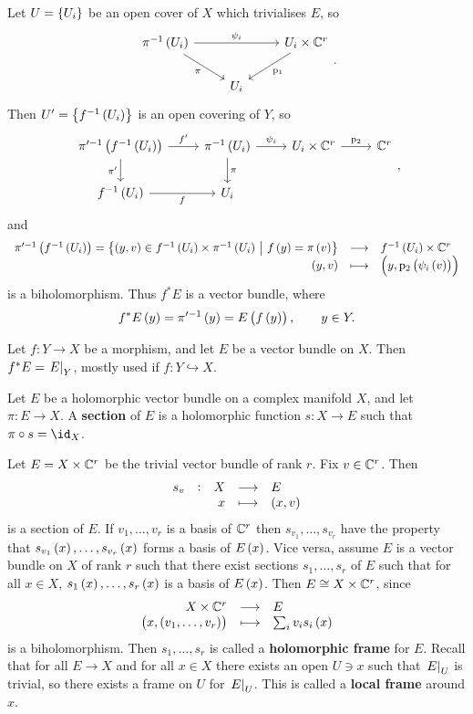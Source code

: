 Let $ U = \cbr{U_i} $ be an open cover of $ X $ which trivialises $ E $, so
$$
\begin{tikzcd}
\pi^{-1}\br{U_i} \arrow{rr}{\psi_i} \arrow[swap]{dr}{\pi} & & U_i \times \CC^r \arrow{dl}{\p_1} \\
& U_i &
\end{tikzcd}.
$$
Then $ U' = \cbr{f^{-1}\br{U_i}} $ is an open covering of $ Y $, so
$$
\begin{tikzcd}
\pi'^{-1}\br{f^{-1}\br{U_i}} \arrow{r}{f'} \arrow[swap]{d}{\pi'} & \pi^{-1}\br{U_i} \arrow{r}{\psi_i} \arrow{d}{\pi} & U_i \times \CC^r \arrow{r}{\p_2} & \CC^r \\
f^{-1}\br{U_i} \arrow[swap]{r}{f} & U_i & &
\end{tikzcd},
$$
and
$$ \function{\pi'^{-1}\br{f^{-1}\br{U_i}} = \cbr{\br{y, v} \in f^{-1}\br{U_i} \times \pi^{-1}\br{U_i} \st f\br{y} = \pi\br{v}}}{f^{-1}\br{U_i} \times \CC^r}{\br{y, v}}{\br{y, \p_2\br{\psi_i\br{v}}}} $$
is a biholomorphism. Thus $ f^*E $ is a vector bundle, where
$$ f^*E\br{y} = \pi'^{-1}\br{y} = E\br{f\br{y}}, \qquad y \in Y. $$

\begin{notation}
Let $ f : Y \to X $ be a morphism, and let $ E $ be a vector bundle on $ X $. Then $ f^*E = \left. E \right|_Y $, mostly used if $ f : Y \hookrightarrow X $.
\end{notation}

\begin{definition}
Let $ E $ be a holomorphic vector bundle on a complex manifold $ X $, and let $ \pi : E \to X $. A \textbf{section} of $ E $ is a holomorphic function $ s : X \to E $ such that $ \pi \circ s = \id_X $.
\end{definition}

\begin{example}
Let $ E = X \times \mathbb{C}^r $ be the trivial vector bundle of rank $ r $. Fix $ v \in \mathbb{C}^r $. Then
$$ \function[s_v]{X}{E}{x}{\br{x, v}} $$
is a section of $ E $. If $ v_1, \dots, v_r $ is a basis of $ \mathbb{C}^r $ then $ s_{v_1}, \dots, s_{v_r} $ have the property that $ s_{v_1}\br{x}, \dots, s_{v_r}\br{x} $ forms a basis of $ E\br{x} $. Vice versa, assume $ E $ is a vector bundle on $ X $ of rank $ r $ such that there exist sections $ s_1, \dots, s_r $ of $ E $ such that for all $ x \in X $, $ s_1\br{x}, \dots, s_r\br{x} $ is a basis of $ E\br{x} $. Then $ E \cong X \times \mathbb{C}^r $, since
$$ \function{X \times \CC^r}{E}{\br{x, \br{v_1, \dots, v_r}}}{\sum_i v_is_i\br{x}} $$
is a biholomorphism. Then $ s_1, \dots, s_r $ is called a \textbf{holomorphic frame} for $ E $. Recall that for all $ E \to X $ and for all $ x \in X $ there exists an open $ U \ni x $ such that $ \left. E \right|_U $ is trivial, so there exists a frame on $ U $ for $ \left. E \right|_U $. This is called a \textbf{local frame} around $ x $.
\end{example}

